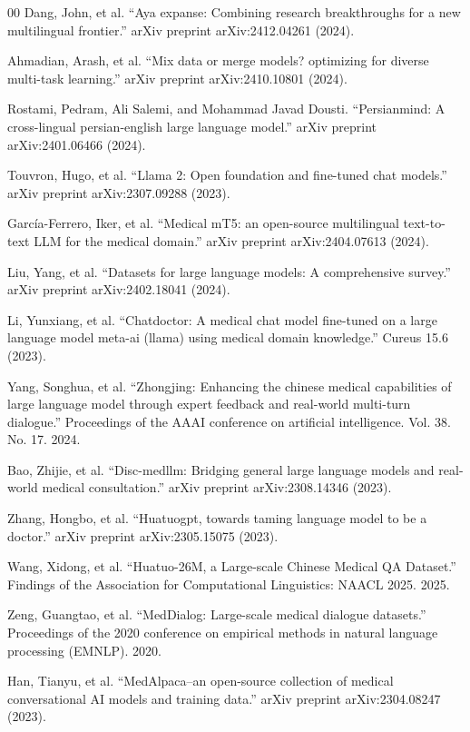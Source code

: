 \documentclass[manuscript,screen,review]{acmart}
\begin{document}
\begin{thebibliography}{00}
Dang, John, et al. ``Aya expanse: Combining research breakthroughs for a new multilingual frontier.'' arXiv preprint arXiv:2412.04261 (2024).

Ahmadian, Arash, et al. ``Mix data or merge models? optimizing for diverse multi-task learning.'' arXiv preprint arXiv:2410.10801 (2024).

Rostami, Pedram, Ali Salemi, and Mohammad Javad Dousti. ``Persianmind: A cross-lingual persian-english large language model.'' arXiv preprint arXiv:2401.06466 (2024).

Touvron, Hugo, et al. ``Llama 2: Open foundation and fine-tuned chat models.'' arXiv preprint arXiv:2307.09288 (2023).

Garc\'ia-Ferrero, Iker, et al. ``Medical mT5: an open-source multilingual text-to-text LLM for the medical domain.'' arXiv preprint arXiv:2404.07613 (2024).

Liu, Yang, et al. ``Datasets for large language models: A comprehensive survey.'' arXiv preprint arXiv:2402.18041 (2024).

Li, Yunxiang, et al. ``Chatdoctor: A medical chat model fine-tuned on a large language model meta-ai (llama) using medical domain knowledge.'' Cureus 15.6 (2023).

Yang, Songhua, et al. ``Zhongjing: Enhancing the chinese medical capabilities of large language model through expert feedback and real-world multi-turn dialogue.'' Proceedings of the AAAI conference on artificial intelligence. Vol. 38. No. 17. 2024.

Bao, Zhijie, et al. ``Disc-medllm: Bridging general large language models and real-world medical consultation.'' arXiv preprint arXiv:2308.14346 (2023).

Zhang, Hongbo, et al. ``Huatuogpt, towards taming language model to be a doctor.'' arXiv preprint arXiv:2305.15075 (2023).

Wang, Xidong, et al. ``Huatuo-26M, a Large-scale Chinese Medical QA Dataset.'' Findings of the Association for Computational Linguistics: NAACL 2025. 2025.

Zeng, Guangtao, et al. ``MedDialog: Large-scale medical dialogue datasets.'' Proceedings of the 2020 conference on empirical methods in natural language processing (EMNLP). 2020.

Han, Tianyu, et al. ``MedAlpaca--an open-source collection of medical conversational AI models and training data.'' arXiv preprint arXiv:2304.08247 (2023).


\end{thebibliography}
\end{document}
